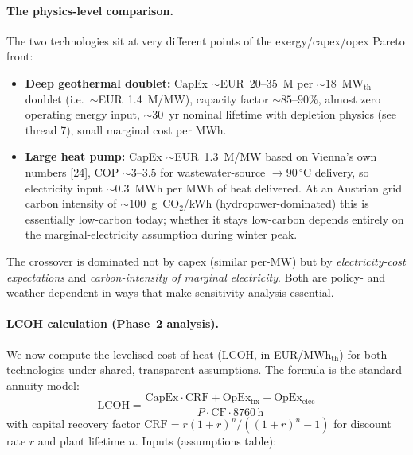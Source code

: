 \documentclass{article}
\begin{document}
\paragraph{The physics-level comparison.}
The two technologies sit at very different points of the
exergy/capex/opex Pareto front:
\begin{itemize}
\item \textbf{Deep geothermal doublet:} CapEx $\sim$EUR~20--35~M per
$\sim 18$~MW$_{\mathrm{th}}$ doublet (i.e.\ $\sim$EUR~1.4~M/MW), capacity
factor $\sim 85$--$90\%$, almost zero operating energy input, $\sim 30$~yr
nominal lifetime with depletion physics (see thread 7), small marginal
cost per MWh.
\item \textbf{Large heat pump:} CapEx $\sim$EUR~1.3~M/MW based on Vienna's
own numbers [24], COP $\sim 3$--$3.5$ for wastewater-source $\to 90\,^\circ$C
delivery, so electricity input $\sim 0.3$~MWh per MWh of heat delivered.
At an Austrian grid carbon intensity of $\sim 100$~g~CO$_2$/kWh
(hydropower-dominated) this is essentially low-carbon today; whether it
stays low-carbon depends entirely on the marginal-electricity assumption
during winter peak.
\end{itemize}
The crossover is dominated not by capex (similar per-MW) but by
\emph{electricity-cost expectations} and \emph{carbon-intensity of
marginal electricity}. Both are policy- and weather-dependent in ways
that make sensitivity analysis essential.

\paragraph{LCOH calculation (Phase~2 analysis).} We now compute the
levelised cost of heat (LCOH, in EUR/MWh$_{\mathrm{th}}$) for both
technologies under shared, transparent assumptions. The formula is
the standard annuity model:
\[
\mathrm{LCOH} =
\frac{\mathrm{CapEx}\cdot\mathrm{CRF} + \mathrm{OpEx_{fix}} + \mathrm{OpEx_{elec}}}
     {P\cdot\mathrm{CF}\cdot 8760\,\mathrm{h}}
\]
with capital recovery factor
$\mathrm{CRF} = r(1+r)^n / ((1+r)^n - 1)$ for discount rate $r$ and
plant lifetime $n$. Inputs (assumptions table):
\end{document}
